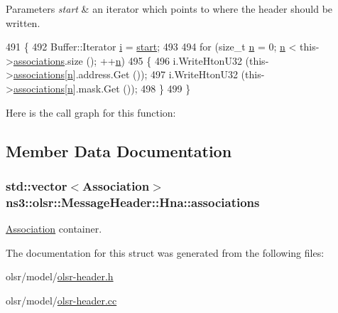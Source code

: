 \begin{DoxyParams}{Parameters}
{\em start} & an iterator which points to where the header should be written. \\
\hline
\end{DoxyParams}

\begin{DoxyCode}
491 \{
492   Buffer::Iterator \hyperlink{bernuolliDistribution_8m_a6f6ccfcf58b31cb6412107d9d5281426}{i} = \hyperlink{namespacevisualizer_1_1core_a2a35e5d8a34af358b508dac8635754e0}{start};
493 
494   \textcolor{keywordflow}{for} (\textcolor{keywordtype}{size\_t} \hyperlink{namespacesample-rng-plot_aeb5ee5c431e338ef39b7ac5431242e1d}{n} = 0; \hyperlink{namespacesample-rng-plot_aeb5ee5c431e338ef39b7ac5431242e1d}{n} < this->\hyperlink{structns3_1_1olsr_1_1MessageHeader_1_1Hna_a3989e2a5026258e7cbde6d7795aa9c9f}{associations}.size (); ++\hyperlink{namespacesample-rng-plot_aeb5ee5c431e338ef39b7ac5431242e1d}{n})
495     \{
496       i.WriteHtonU32 (this->\hyperlink{structns3_1_1olsr_1_1MessageHeader_1_1Hna_a3989e2a5026258e7cbde6d7795aa9c9f}{associations}[\hyperlink{namespacesample-rng-plot_aeb5ee5c431e338ef39b7ac5431242e1d}{n}].address.Get ());
497       i.WriteHtonU32 (this->\hyperlink{structns3_1_1olsr_1_1MessageHeader_1_1Hna_a3989e2a5026258e7cbde6d7795aa9c9f}{associations}[\hyperlink{namespacesample-rng-plot_aeb5ee5c431e338ef39b7ac5431242e1d}{n}].mask.Get ());
498     \}
499 \}
\end{DoxyCode}


Here is the call graph for this function\+:




\subsection{Member Data Documentation}
\subsubsection[{\texorpdfstring{associations}{associations}}]{\setlength{\rightskip}{0pt plus 5cm}std\+::vector$<${\bf Association}$>$ ns3\+::olsr\+::\+Message\+Header\+::\+Hna\+::associations}\hypertarget{structns3_1_1olsr_1_1MessageHeader_1_1Hna_a3989e2a5026258e7cbde6d7795aa9c9f}{}\label{structns3_1_1olsr_1_1MessageHeader_1_1Hna_a3989e2a5026258e7cbde6d7795aa9c9f}


\hyperlink{structns3_1_1olsr_1_1MessageHeader_1_1Hna_1_1Association}{Association} container. 



The documentation for this struct was generated from the following files\+:\begin{DoxyCompactItemize}
\item 
olsr/model/\hyperlink{olsr-header_8h}{olsr-\/header.\+h}\item 
olsr/model/\hyperlink{olsr-header_8cc}{olsr-\/header.\+cc}\end{DoxyCompactItemize}
